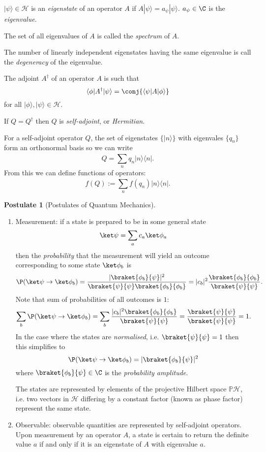 \documentclass[a4paper]{article}
\renewcommand*{\H}{\mathcal{H}}
\newcommand*{\bk}{\braket}
\theoremstyle{definition}
\newtheorem*{postulate}{Postulate}
\begin{document}
\begin{defi}
  \(|\psi\rangle \in \H\) is an \emph{eigenstate} of an operator \(A\) if \(A|\psi\rangle = a_\psi|\psi\rangle\). \(a_\psi\in\C\) is the \emph{eigenvalue}.

  The set of all eigenvalues of \(A\) is called the \emph{spectrum} of \(A\).

  The number of linearly independent eigenstates having the same eigenvalue is call the \emph{degeneracy} of the eigenvalue.
\end{defi}

\begin{defi}[Adjoint]
  The adjoint \(A^\dag\) of an operator \(A\) is such that
  \[
    \langle\phi|A^\dag|\psi\rangle = \conj{\langle\psi|A|\phi\rangle} 
  \] 
  for all \(|\phi\rangle, |\psi\rangle \in \H\).
\end{defi}

\begin{defi}
  If \(Q = Q^\dag\) then \(Q\) is \emph{self-adjoint}, or \emph{Hermitian}.
\end{defi}

For a self-adjoint operator \(Q\), the set of eigenstates \(\{|n\rangle\}\) with eigenvales \(\{q_n\}\) form an orthonormal basis so we can write
\[
  Q = \sum_{n}^{ }q_n |n\rangle \langle n|.
\]
From this we can define functions of operators:
\[
  f(Q) := \sum_{n}^{ }f(q_n) |n\rangle \langle n|.
\]

\begin{postulate}[Postulates of Quantum Mechanics]\leavevmode
  \begin{enumerate}
  \item Measurement: if a state is prepared to be in some general state\
    \[
      \ket \psi = \sum_ac_a\ket \phi_a
    \]
    then the \emph{probability} that the measurement will yield an outcome corresponding to some state \(\ket \phi_b\) is
    \[
      \P(\ket \psi\to \ket\phi_b) = \frac{|\bk{\phi_b}{\psi}|^2}{\bk{\psi}{\psi}\bk{\phi_b}{\phi_b}} = |c_b|^2 \frac{\bk{\phi_b}{\phi_b}}{\bk{\psi}{\psi}}.
    \]
    Note that sum of probabilities of all outcomes is \(1\):
    \[
      \sum_b\P(\ket\psi \to \ket\phi_b) = \sum_b\frac{|c_b|^2\bk{\phi_b}{\phi_b}}{\bk{\psi}{\psi}} = \frac{\bk{\psi}{\psi}}{\bk{\psi}{\psi}} = 1.
    \]
    In the case where the states are \emph{normalised}, i.e. \(\bk{\psi}{\psi} = 1\) then this simplifies to
    \[
      \P(\ket\psi \to \ket\phi_b) = |\bk{\phi_b}{\psi}|^2
    \]
    where \(\bk{\phi_b}{\psi} \in\C\) is the \emph{probability amplitude}.

    The states are represented by elements of the projective Hilbert space \(\mathbb{P}\H\), i.e. two vectors in \(\H\) differing by a constant factor (known as phase factor) represent the same state.
  \item Observable: observable quantities are represented by self-adjoint operators. Upon measurement by an operator \(A\), a state is certain to return the definite value \(a\) if and only if it is an eigenstate of \(A\) with eigenvalue \(a\).
  \end{enumerate}
\end{postulate}
\end{document}
